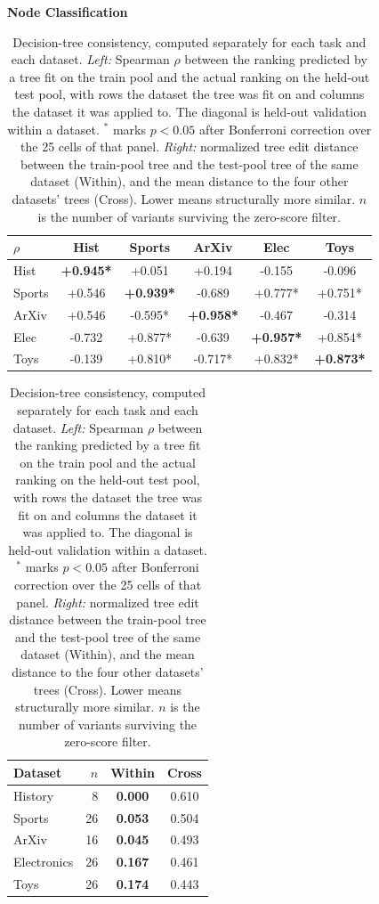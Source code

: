 \begin{table}[htbp]
\centering
\renewcommand{\arraystretch}{1.25}
\small
\setlength{\tabcolsep}{3.7pt}

\caption{Decision-tree consistency, computed separately for each task and each dataset. \textit{Left:} Spearman $\rho$ between the ranking predicted by a tree fit on the train pool and the actual ranking on the held-out test pool, with rows the dataset the tree was fit on and columns the dataset it was applied to. The diagonal is held-out validation within a dataset. $^{*}$ marks $p<0.05$ after Bonferroni correction over the 25 cells of that panel. \textit{Right:} normalized tree edit distance between the train-pool tree and the test-pool tree of the same dataset (Within), and the mean distance to the four other datasets' trees (Cross). Lower means structurally more similar. $n$ is the number of variants surviving the zero-score filter.}
\label{tab:dt_consistency}

\textbf{Node Classification}

\begin{tabular}[t]{lccccc}
\toprule
$\rho$ & Hist & Sports & ArXiv & Elec & Toys \\
\midrule
Hist  & \textbf{+0.945*} & +0.051\phantom{*} & +0.194\phantom{*} & -0.155\phantom{*} & -0.096\phantom{*} \\
Sports& +0.546\phantom{*} & \textbf{+0.939*} & -0.689\phantom{*} & +0.777* & +0.751* \\
ArXiv & +0.546\phantom{*} & -0.595* & \textbf{+0.958*} & -0.467\phantom{*} & -0.314\phantom{*} \\
Elec  & -0.732\phantom{*} & +0.877* & -0.639\phantom{*} & \textbf{+0.957*} & +0.854* \\
Toys  & -0.139\phantom{*} & +0.810* & -0.717* & +0.832* & \textbf{+0.873*} \\
\bottomrule
\end{tabular}%
\hspace{1.5em}
\begin{tabular}[t]{lrcc}
\toprule
Dataset & $n$ & Within & Cross \\
\midrule
History     & 8 & \textbf{0.000} & 0.610 \\
Sports      & 26 & \textbf{0.053} & 0.504 \\
ArXiv       & 16 & \textbf{0.045} & 0.493 \\
Electronics & 26 & \textbf{0.167} & 0.461 \\
Toys        & 26 & \textbf{0.174} & 0.443 \\
\bottomrule
\end{tabular}


\end{table}
